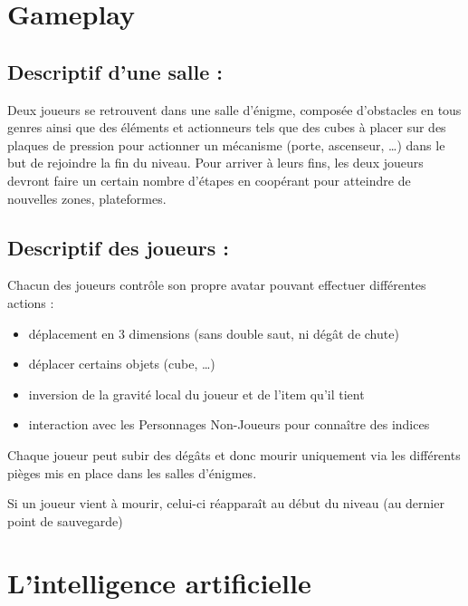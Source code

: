 \documentclass[a4paper,11pt]{article}
\begin{document}
\section{Gameplay}

\subsection{Descriptif d’une salle :} 

Deux joueurs se retrouvent dans une salle d'énigme, 
composée d’obstacles en tous genres ainsi que des éléments et actionneurs tels que des cubes 
à placer sur des plaques de pression pour actionner un mécanisme (porte, ascenseur, …) dans 
le but de rejoindre la fin du niveau. Pour arriver à leurs fins, les deux joueurs devront faire 
un certain nombre d’étapes en coopérant pour atteindre de nouvelles zones, plateformes.\newline

\subsection{Descriptif des joueurs :} 

Chacun des joueurs contrôle son propre avatar pouvant effectuer différentes actions : 
\newline

\begin{itemize}
    \item déplacement en 3 dimensions (sans double saut, ni dégât de chute)
    \item déplacer certains objets (cube, …)
    \item inversion de la gravité local du joueur et de l’item qu’il tient
    \item interaction avec les Personnages Non-Joueurs pour connaître des indices \newline
\end{itemize}



Chaque joueur peut subir des dégâts et donc mourir uniquement via les différents pièges
 mis en place dans les salles d'énigmes.

Si un joueur vient à mourir, celui-ci réapparaît au début du niveau (au dernier point de sauvegarde) 

\section{L’intelligence artificielle}
\end{document}
